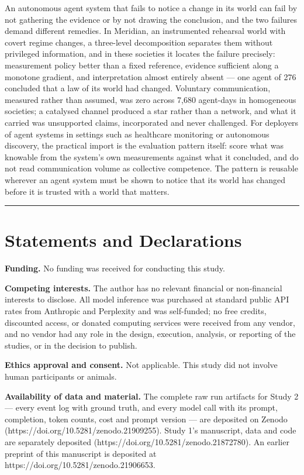 \documentclass[pdflatex,sn-basic]{sn-jnl}
\begin{document}
An autonomous agent system that fails to notice a change in its world can fail by not
gathering the evidence or by not drawing the conclusion, and the two failures demand
different remedies. In Meridian, an instrumented rehearsal world with covert regime changes,
a three-level decomposition separates them without privileged information, and in these
societies it locates the failure precisely: measurement policy better than a fixed
reference, evidence sufficient along a monotone gradient, and interpretation almost entirely
absent --- one agent of 276 concluded that a law of its world had changed. Voluntary
communication, measured rather than assumed, was zero across 7,680 agent-days in homogeneous
societies; a catalysed channel produced a star rather than a network, and what it carried
was unsupported claims, incorporated and never challenged. For deployers of agent systems in
settings such as healthcare monitoring or autonomous discovery, the practical import is the
evaluation pattern itself: score what was knowable from the system's own measurements
against what it concluded, and do not read communication volume as collective competence.
The pattern is reusable wherever an agent system must be shown to notice that its world has
changed before it is trusted with a world that matters.

\begin{center}\rule{0.5\linewidth}{0.5pt}\end{center}

\hypertarget{statements-and-declarations}{%
\section*{Statements and Declarations}\label{statements-and-declarations}}

\textbf{Funding.} No funding was received for conducting this study.

\textbf{Competing interests.} The author has no relevant financial or non-financial interests to
disclose. All model inference was purchased at standard public API rates from Anthropic and
Perplexity and was self-funded; no free credits, discounted access, or donated computing
services were received from any vendor, and no vendor had any role in the design, execution,
analysis, or reporting of the studies, or in the decision to publish.

\textbf{Ethics approval and consent.} Not applicable. This study did not involve human
participants or animals.

\textbf{Availability of data and material.} The complete raw run artifacts for Study 2 --- every event log with
ground truth, and every model call with its prompt, completion, token counts, cost and prompt
version --- are deposited on Zenodo (https://doi.org/10.5281/zenodo.21909255). Study 1's
manuscript, data and code are separately deposited (https://doi.org/10.5281/zenodo.21872780).
An earlier preprint of this manuscript is deposited at
https://doi.org/10.5281/zenodo.21906653.
\end{document}
